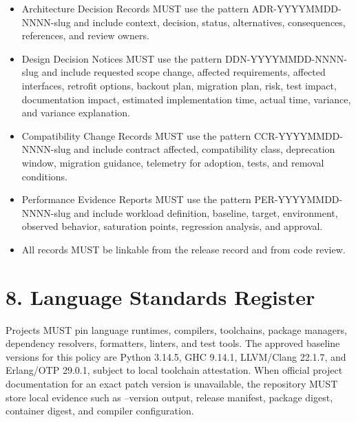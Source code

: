 \documentclass[11pt]{article}
\begin{document}
\begin{itemize}
  \item Architecture Decision Records MUST use the pattern ADR-YYYYMMDD-NNNN-slug and include context, decision, status, alternatives, consequences, references, and review owners.
  \item Design Decision Notices MUST use the pattern DDN-YYYYMMDD-NNNN-slug and include requested scope change, affected requirements, affected interfaces, retrofit options, backout plan, migration plan, risk, test impact, documentation impact, estimated implementation time, actual time, variance, and variance explanation.
  \item Compatibility Change Records MUST use the pattern CCR-YYYYMMDD-NNNN-slug and include contract affected, compatibility class, deprecation window, migration guidance, telemetry for adoption, tests, and removal conditions.
  \item Performance Evidence Reports MUST use the pattern PER-YYYYMMDD-NNNN-slug and include workload definition, baseline, target, environment, observed behavior, saturation points, regression analysis, and approval.
  \item All records MUST be linkable from the release record and from code review.
\end{itemize}

\hypertarget{sec-language-standards}{}
\section*{8. Language Standards Register}
Projects MUST pin language runtimes, compilers, toolchains, package managers, dependency resolvers, formatters, linters, and test tools. The approved baseline versions for this policy are Python 3.14.5, GHC 9.14.1, LLVM/Clang 22.1.7, and Erlang/OTP 29.0.1, subject to local toolchain attestation. When official project documentation for an exact patch version is unavailable, the repository MUST store local evidence such as --version output, release manifest, package digest, container digest, and compiler configuration.
\end{document}
